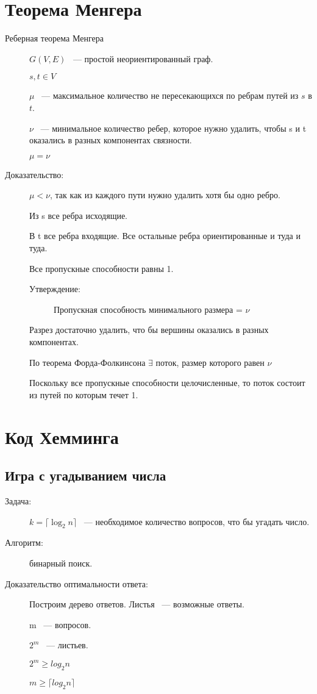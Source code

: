 \documentclass[12pt]{article}
\begin{document}
\section{Теорема Менгера} 
\begin{description}
\item[Реберная теорема Менгера] $G(V, E)$ ~--- простой неориентированный граф.

$s, t \in V$

$\mu$ ~--- максимальное количество не пересекающихся по ребрам  путей из $s$ в $t$.

$\nu$ ~--- минимальное количество ребер, которое нужно удалить, чтобы s и t оказались в разных компонентах связности.

$\mu = \nu$

\item[Доказательство:] 

 $\mu < \nu$, так как из каждого пути нужно удалить хотя бы одно ребро. 

Из s все ребра исходящие. 

В t все ребра входящие. Все остальные ребра ориентированные и туда и туда. 

Все пропускные способности равны 1.

\begin{description}
\item[Утверждение:] Пропускная способность минимального размера = $\nu$ 
\end{description}


Разрез достаточно удалить, что бы вершины оказались в разных компонентах. 

По теорема Форда-Фолкинсона $\exists$ поток, размер которого равен $\nu$

Поскольку все пропускные способности целочисленные, то поток состоит из путей по которым течет 1. 
\end{description}

\section{Код Хемминга}
\subsection{Игра с угадыванием числа}

\begin{description}
\item[Задача:] $k = \lceil \log_2 n \rceil$ ~--- необходимое количество вопросов, что бы угадать число.

\item[Алгоритм:] бинарный поиск.

\item[Доказательство оптимальности ответа:]  Построим дерево ответов. Листья ~--- возможные ответы. 

m ~--- вопросов. 

$2^m$ ~--- листьев. 

$2^m \ge log_2 n$

$m \ge \lceil log_2 n \rceil$

\end{description}
\end{document}
